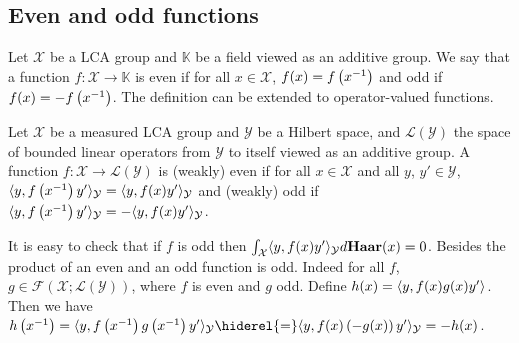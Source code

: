 \subsection{Even and odd functions}
Let $\mathcal{X}$ be a \ac{LCA} group and $\mathbb{K}$ be a field viewed as an
additive group. We say that a function $f:\mathcal{X}\to\mathbb{K}$ is even if
for all $x\in\mathcal{X}$, $f(x)=f\left({x}^{-1}\right)$ and odd if
$f(x)=-f\left({x}^{-1}\right)$. The definition can be extended to
operator-valued functions.
\begin{definition}
    Let $\mathcal{X}$ be a measured \ac{LCA} group and $\mathcal{Y}$ be a
    Hilbert space, and $\mathcal{L}(\mathcal{Y})$ the space of bounded linear
    operators from $\mathcal{Y}$ to itself viewed as an additive group. A
    function $f:\mathcal{X}\to\mathcal{L}(\mathcal{Y})$ is (weakly) even if for
    all $x\in\mathcal{X}$ and all $y$, $y'\in\mathcal{Y}$,
    $\langle y,f\left({x}^{-1}\right)y'\rangle_{\mathcal{Y}} =
    \langle y,f(x)y'\rangle_{\mathcal{Y}}$ and (weakly) odd if
    $\langle y,f\left({x}^{-1}\right)y'\rangle_{\mathcal{Y}} =
    -\langle y,f(x)y'\rangle_{\mathcal{Y}}$.
\end{definition}
It is easy to check that if $f$ is odd then
$\int_{\mathcal{X}}\langle y,f(x)y'\rangle_{\mathcal{Y}}d\mathbf{Haar}(x)=0$.  Besides the
product of an even and an odd function is odd. Indeed for all $f$,
$g\in\mathcal{F}(\mathcal{X};\mathcal{L}(\mathcal{Y}))$, where $f$ is even and
$g$ odd. Define $h(x)=\langle y,f(x)g(x)y'\rangle$. Then we have
$h\left(\inv{x}\right) = \inner{y, f\left(\inv{x}\right)
g\left(\inv{x}\right)y'}_{\mathcal{Y}}
\hiderel{=}\inner{y,f(x)\left(-g(x)\right)y'}_{\mathcal{Y}} =-h(x)$.
